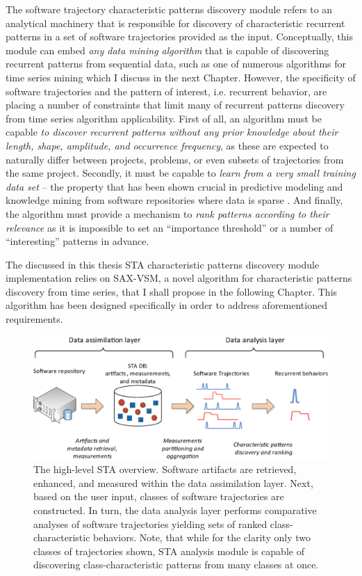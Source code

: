 The software trajectory characteristic patterns discovery module refers to an analytical machinery that 
is responsible for discovery of characteristic recurrent patterns in a set of software trajectories provided as 
the input. Conceptually, this module can embed \textit{any data mining algorithm} that is capable of 
discovering recurrent patterns from sequential data, such as one of numerous algorithms for time series 
mining which I discuss in the next Chapter.
However, the specificity of software trajectories and the pattern of interest, i.e. recurrent behavior, 
are placing a number of constraints that limit many of recurrent patterns discovery from time series 
algorithm applicability.
First of all, an algorithm must be capable \textit{to discover recurrent patterns without any prior knowledge 
about their length, shape, amplitude, and occurrence frequency}, as these are expected to naturally differ 
between projects, problems, or even subsets of trajectories from the same project.
Secondly, it must be capable to \textit{learn from a very small training data set} --
the property that has been shown crucial in predictive modeling and knowledge mining from software 
repositories where data is sparse \cite{citeulike:6055293}.
And finally, the algorithm must provide a mechanism to \textit{rank patterns according to their relevance} 
as it is impossible to set an ``importance threshold'' or a number of ``interesting'' patterns in advance.

The discussed in this thesis STA characteristic patterns discovery module implementation relies on SAX-VSM,
a novel algorithm for characteristic patterns discovery from time series, that I shall propose in the 
following Chapter. This algorithm has been designed specifically in order to address aforementioned requirements.

\begin{figure}[t]
   \centering
   \includegraphics[width=150mm]{figures/Flow-analysis.eps}
   \caption{The high-level STA overview. Software artifacts are retrieved, enhanced, and measured within the
   data assimilation layer. Next, based on the user input, classes of software trajectories are constructed.   
   In turn, the data analysis layer performs comparative analyses of software trajectories yielding sets
   of ranked class-characteristic behaviors.
   Note, that while for the clarity only two classes of trajectories shown, STA analysis module is capable of
   discovering class-characteristic patterns from many classes at once.}
   \label{fig:sta-full-overview}
\end{figure}

